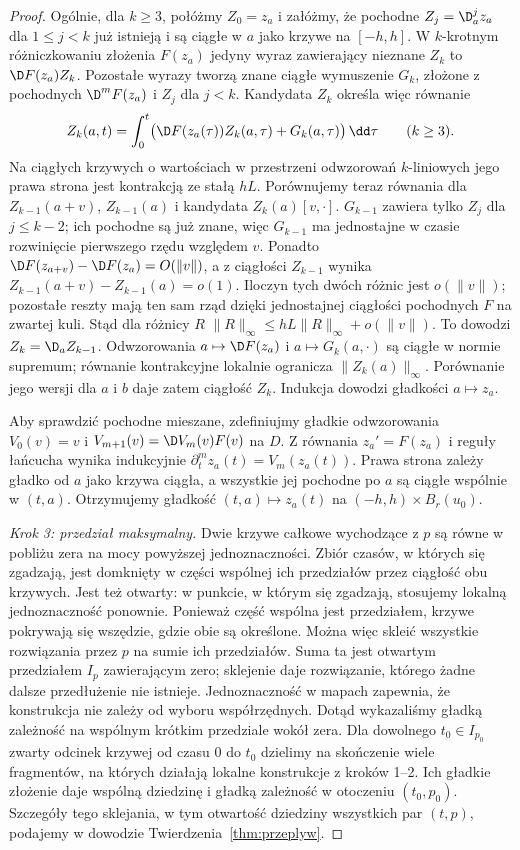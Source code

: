 \begin{proof}
Ogólnie, dla $k\ge3$, połóżmy $Z_0=z_a$ i załóżmy,
że pochodne $Z_j=\D_a^j z_a$ dla $1\le j<k$
już istnieją i są ciągłe w $a$ jako krzywe na $[-h,h]$.
W $k$-krotnym różniczkowaniu złożenia $F(z_a)$ jedyny wyraz
zawierający nieznane $Z_k$ to $\D F(z_a)Z_k$.
Pozostałe wyrazy tworzą znane ciągłe wymuszenie $G_k$,
złożone z pochodnych $\D^mF(z_a)$ i $Z_j$ dla $j<k$.
Kandydata $Z_k$ określa więc równanie
\[
 Z_k(a,t)=\int_0^t\bigl(\D F(z_a(\tau))Z_k(a,\tau)
                         +G_k(a,\tau)\bigr)\,\dd\tau
 \qquad(k\ge3).
\]
Na ciągłych krzywych o wartościach w przestrzeni odwzorowań
$k$-liniowych jego prawa strona jest kontrakcją ze stałą $hL$.
Porównujemy teraz równania dla $Z_{k-1}(a+v)$, $Z_{k-1}(a)$
i kandydata $Z_k(a)[v,\cdot]$.
$G_{k-1}$ zawiera tylko $Z_j$ dla $j\le k-2$; ich pochodne
są już znane, więc $G_{k-1}$ ma jednostajne w czasie
rozwinięcie pierwszego rzędu względem $v$.
Ponadto $\D F(z_{a+v})-\D F(z_a)=O(\|v\|)$, a z ciągłości
$Z_{k-1}$ wynika $Z_{k-1}(a+v)-Z_{k-1}(a)=o(1)$.
Iloczyn tych dwóch różnic jest $o(\|v\|)$; pozostałe
reszty mają ten sam rząd dzięki jednostajnej ciągłości
pochodnych $F$ na zwartej kuli. Stąd dla różnicy $R$
$\|R\|_\infty\leq hL\|R\|_\infty+o(\|v\|)$.
To dowodzi $Z_k=\D_aZ_{k-1}$. Odwzorowania
$a\mapsto\D F(z_a)$ i $a\mapsto G_k(a,\cdot)$ są ciągłe
w normie supremum; równanie kontrakcyjne lokalnie ogranicza
$\|Z_k(a)\|_\infty$. Porównanie jego wersji dla $a$ i $b$
daje zatem ciągłość $Z_k$. Indukcja dowodzi gładkości
$a\mapsto z_a$.

Aby sprawdzić pochodne mieszane, zdefiniujmy gładkie odwzorowania
$V_0(v)=v$ i $V_{m+1}(v)=\D V_m(v)F(v)$ na $D$.
Z równania $z_a'=F(z_a)$ i reguły łańcucha wynika indukcyjnie
$\partial_t^m z_a(t)=V_m(z_a(t))$. Prawa strona zależy
gładko od $a$ jako krzywa ciągła, a wszystkie jej pochodne
po $a$ są ciągłe wspólnie w $(t,a)$. Otrzymujemy gładkość
$(t,a)\mapsto z_a(t)$ na $(-h,h)\times B_r(u_0)$.

\emph{Krok 3: przedział maksymalny.}
Dwie krzywe całkowe wychodzące z $p$ są równe w pobliżu zera
na mocy powyższej jednoznaczności. Zbiór czasów, w których
się zgadzają, jest domknięty w części wspólnej ich
przedziałów przez ciągłość obu krzywych. Jest też otwarty:
w punkcie, w którym się zgadzają, stosujemy lokalną
jednoznaczność ponownie. Ponieważ część wspólna jest przedziałem,
krzywe pokrywają się wszędzie, gdzie obie są określone.
Można więc skleić wszystkie rozwiązania przez $p$ na sumie
ich przedziałów. Suma ta jest otwartym przedziałem $I_p$
zawierającym zero; sklejenie daje rozwiązanie, którego żadne
dalsze przedłużenie nie istnieje. Jednoznaczność w mapach
zapewnia, że konstrukcja nie zależy od wyboru współrzędnych.
Dotąd wykazaliśmy gładką zależność na wspólnym krótkim przedziale
wokół zera. Dla dowolnego $t_0\in I_{p_0}$ zwarty odcinek krzywej
od czasu $0$ do $t_0$ dzielimy na skończenie wiele fragmentów,
na których działają lokalne konstrukcje z kroków 1--2.
Ich gładkie złożenie daje wspólną dziedzinę i gładką zależność
w otoczeniu $(t_0,p_0)$. Szczegóły tego sklejania,
w tym otwartość dziedziny wszystkich par $(t,p)$,
podajemy w dowodzie Twierdzenia~\ref{thm:przeplyw}.
\end{proof}

